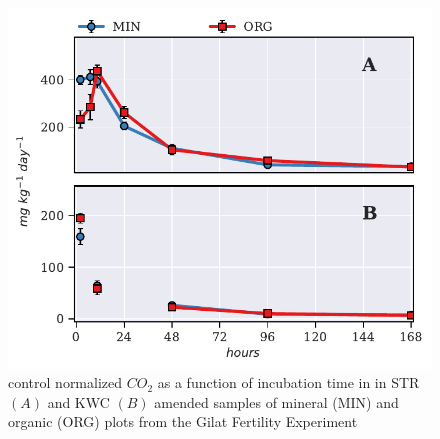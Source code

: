             \begin{figure}[H]
            	\centering
            	\includegraphics[width=\linewidth]{thesis_figures/preliminary/control_normalized/Resp.pdf}
            	\caption{control normalized $CO_2$  as a function of incubation time in in STR $\left(A\right)$ and KWC $\left(B\right)$ amended samples of mineral (MIN) and organic (ORG) plots from the Gilat Fertility Experiment}
            	\label{fig:nor_resp_treated_preliminary}
            \end{figure}

